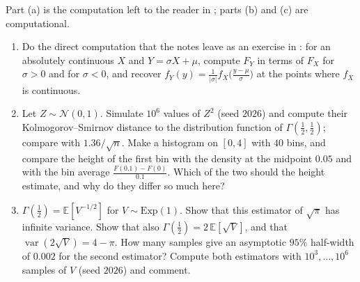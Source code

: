 \begin{exercise}\label{ex:tr-chi-square}
\easy Part (a) is the computation left to the reader in ; parts (b) and
(c) are computational.
\begin{enumerate}[label=(\alph*)]
  \item Do the direct computation that the notes leave as an exercise in
    : for an absolutely continuous $X$ and $Y=\sigma X+\mu$,
    compute $F_Y$ in terms of $F_X$ for $\sigma>0$ and for $\sigma<0$, and recover
    $f_Y(y)=\frac1{|\sigma|}f_X\big(\frac{y-\mu}\sigma\big)$ at the points where $f_X$ is continuous.
  \item Let $Z\sim\mathcal N(0,1)$. Simulate $10^6$ values of $Z^2$ (seed $2026$) and compute their
    Kolmogorov--Smirnov distance to the distribution function of $\Gamma(\frac12,\frac12)$; compare
    with $1.36/\sqrt n$. Make a histogram on $[0,4]$ with $40$ bins, and compare the height of the
    first bin with the density at the midpoint $0.05$ and with the bin average
    $\frac{F(0.1)-F(0)}{0.1}$. Which of the two should the height estimate, and why do they differ so
    much here?
  \item $\Gamma(\frac12)=\mathbb E[V^{-1/2}]$ for $V\sim\mathrm{Exp}(1)$. Show that this estimator
    of $\sqrt\pi$ has infinite variance. Show that also $\Gamma(\frac12)=2\,\mathbb E[\sqrt V]$, and
    that $\operatorname{var}(2\sqrt V)=4-\pi$. How many samples give an asymptotic $95\%$
    half-width of $0.002$ for the second estimator? Compute both estimators with $10^3,\dots,10^6$
    samples of $V$ (seed $2026$) and comment.
\end{enumerate}
\end{exercise}

